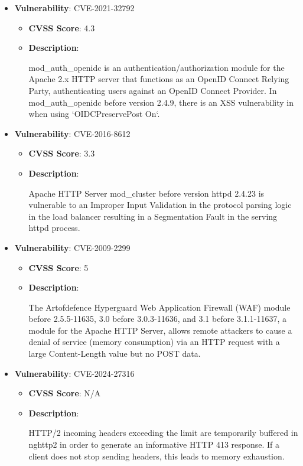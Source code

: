 \documentclass{article}
\begin{document}
\begin{itemize}
        \item \textbf{Vulnerability}: CVE-2021-32792
        \begin{itemize}
            \item \textbf{CVSS Score}:  4.3 
            \item \textbf{Description}:
            \parbox[t]{0.9\linewidth}{
                \ttfamily mod\_auth\_openidc is an authentication/authorization module for the Apache 2.x HTTP server that functions as an OpenID Connect Relying Party, authenticating users against an OpenID Connect Provider. In mod\_auth\_openidc before version 2.4.9, there is an XSS vulnerability in when using `OIDCPreservePost On`.
            }
        \end{itemize}
    
        \item \textbf{Vulnerability}: CVE-2016-8612
        \begin{itemize}
            \item \textbf{CVSS Score}:  3.3 
            \item \textbf{Description}:
            \parbox[t]{0.9\linewidth}{
                \ttfamily Apache HTTP Server mod\_cluster before version httpd 2.4.23 is vulnerable to an Improper Input Validation in the protocol parsing logic in the load balancer resulting in a Segmentation Fault in the serving httpd process.
            }
        \end{itemize}
    
        \item \textbf{Vulnerability}: CVE-2009-2299
        \begin{itemize}
            \item \textbf{CVSS Score}:  5 
            \item \textbf{Description}:
            \parbox[t]{0.9\linewidth}{
                \ttfamily The Artofdefence Hyperguard Web Application Firewall (WAF) module before 2.5.5-11635, 3.0 before 3.0.3-11636, and 3.1 before 3.1.1-11637, a module for the Apache HTTP Server, allows remote attackers to cause a denial of service (memory consumption) via an HTTP request with a large Content-Length value but no POST data.
            }
        \end{itemize}
    
        \item \textbf{Vulnerability}: CVE-2024-27316
        \begin{itemize}
            \item \textbf{CVSS Score}:  N/A 
            \item \textbf{Description}:
            \parbox[t]{0.9\linewidth}{
                \ttfamily HTTP/2 incoming headers exceeding the limit are temporarily buffered in nghttp2 in order to generate an informative HTTP 413 response. If a client does not stop sending headers, this leads to memory exhaustion.
            }
        \end{itemize}
    

\end{itemize}
\end{document}
